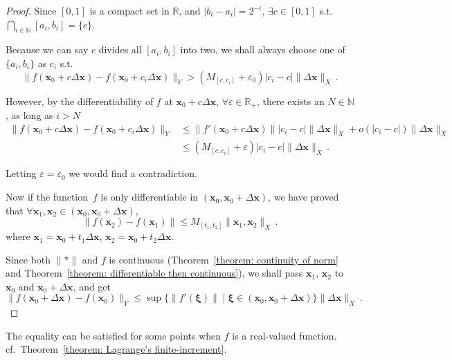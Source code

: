 \documentclass[openany]{book}
\theoremstyle{plain}
\theoremstyle{definition}
\newcommand*{\bv}{\boldsymbol} %
\begin{document}
\begin{proof}
	Since $[0, 1]$ is a compact set in $\mathbb R$, and $|b_i - a_i| = 2^{-i}$, $\exists c \in [0, 1]$ s.t.\ $\bigcap_{i \in \mathbb N} [a_i, b_i] = \{c\}$.

	Because we can say $c$ divides all $[a_i, b_i]$ into two, we shall always choose one of $\{a_i, b_i\}$ as $c_i$ s.t.\ 
	\begin{equation}\label{equation: inequality that violates differentiable}
		\|f(\bv x_0 + c \Delta \bv x) - f(\bv x_0 + c_i \Delta \bv x)\|_Y
			> (M_{[c, c_i]} + \varepsilon_0) |c_i - c| \|\Delta \bv x\|_X\,.
	\end{equation}

	However, by the differentiability of $f$ at $\bv x_0 + c \Delta \bv x$, $\forall \varepsilon \in \mathbb R_+$, there exists an $N \in \mathbb N$, as long as $i > N$
	\begin{align*}
		\|f(\bv x_0 + c \Delta \bv x) - f(\bv x_0 + c_i \Delta \bv x)\|_Y 
			&\leq \|f'(\bv x_0 + c\Delta \bv x)\||c_i - c|\|\Delta \bv x\|_X
				+ o(|c_i - c|) \|\Delta \bv x\|_X
		\\
			&\leq (M_{[c, c_i]} + \varepsilon) |c_i - c|\|\Delta \bv x\|_X\,.
	\end{align*}

	Letting $\varepsilon = \varepsilon_0$ we would find a contradiction.

	Now if the function~$f$ is only differentiable in $(\bv x_0, \bv x_0 + \Delta \bv x)$, we have proved that $\forall \bv x_1, \bv x_2 \in (\bv x_0, \bv x_0 + \Delta \bv x)$, 
	\begin{equation*}
		\|f(\bv x_2) - f(\bv x_1)\| \leq M_{[t_1, t_2]} \|\bv x_1, \bv x_2\|_X\,.
	\end{equation*}
	where $\bv x_1 = \bv x_0 + t_1 \Delta \bv x$, $\bv x_2 = \bv x_0 + t_2 \Delta \bv x$.

	Since both $\|*\|$ and $f$ is continuous (Theorem~\ref{theorem: continuity of norm} and Theorem~\ref{theorem: differentiable then continuous}), we shall pass $\bv x_1$, $\bv x_2$ to $\bv x_0$ and $\bv x_0 + \Delta \bv x$, and get
	\begin{equation*}
		\|f(\bv x_0 + \Delta \bv x) - f(\bv x_0)\|_Y 
			\leq \sup \{\|f'(\bv \xi)\|  \mid \bv \xi \in (\bv x_0, \bv x_0 + \Delta \bv x)\} \|\Delta \bv x\|_X\,.
	\end{equation*}
\end{proof}

The equality can be satisfied for some points when $f$ is a real-valued function. 
cf.\ Theorem~\ref{theorem: Lagrange's finite-increment}.
\end{document}
